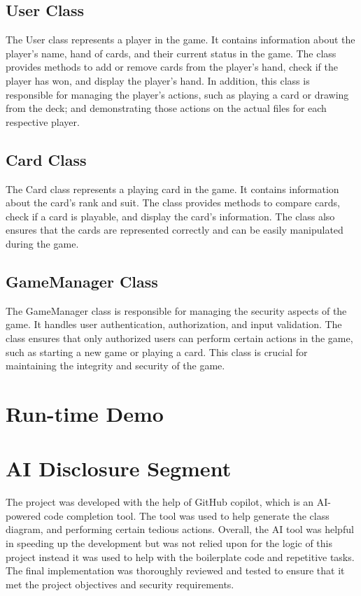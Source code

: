 \documentclass[conference]{IEEEtran}
\begin{document}
\subsection{User Class}
The User class represents a player in the game. It contains information about the player's name, hand of cards, and their current status in the game. The class provides methods to add or remove cards from the player's hand, check if the player has won, and display the player's hand. In addition, this class is responsible for managing the player's actions, such as playing a card or drawing from the deck; and demonstrating those actions on the actual files for each respective player.

\subsection{Card Class}
The Card class represents a playing card in the game. It contains information about the card's rank and suit. The class provides methods to compare cards, check if a card is playable, and display the card's information. The class also ensures that the cards are represented correctly and can be easily manipulated during the game.

\subsection{GameManager Class}
The GameManager class is responsible for managing the security aspects of the game. It handles user authentication, authorization, and input validation. The class ensures that only authorized users can perform certain actions in the game, such as starting a new game or playing a card. This class is crucial for maintaining the integrity and security of the game.

\section{Run-time Demo}


\section{AI Disclosure Segment}
The project was developed with the help of GitHub copilot, which is an AI-powered code completion tool. The tool was used to help generate  the class diagram, and performing certain tedious actions. Overall, the AI tool was helpful in speeding up the development but was not relied upon for the logic of this project instead it was used to help with the boilerplate code and repetitive tasks. The final implementation was thoroughly reviewed and tested to ensure that it met the project objectives and security requirements.
\end{document}
